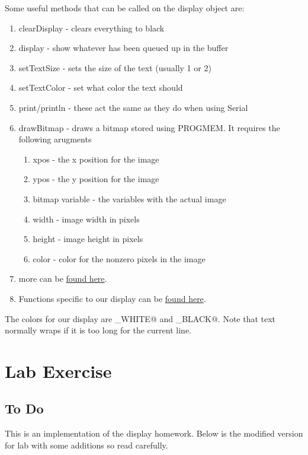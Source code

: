 Some useful methods that can be called on the display object are:
\begin{enumerate}
	\item clearDisplay - clears everything to black 
	\item display - show whatever has been queued up in the buffer
	\item setTextSize - sets the size of the text (usually 1 or 2)
	\item setTextColor - set what color the text should
	\item print/println - these act the same as they do when using Serial
	\item drawBitmap - draws a bitmap stored using PROGMEM. It requires the following arugments
	\begin{enumerate}
		\item xpos - the x position for the image
		\item ypos - the y position for the image
		\item bitmap variable - the variables with the actual image
		\item width - image width in pixels
		\item height - image height in pixels 
		\item color - color for the nonzero pixels in the image
	\end{enumerate}
	\item more can be \href{https://learn.adafruit.com/adafruit-gfx-graphics-library/graphics-primitives}{found here}.
	\item Functions specific to our display can be \href{https://github.com/adafruit/Adafruit_SSD1306/blob/master/Adafruit_SSD1306.h}{found here}.
\end{enumerate}
The colors for our display are _WHITE@ and _BLACK@. Note that text normally 
wraps if it is too long for the current line.

\section{Lab Exercise}
\subsection{To Do}
This is an implementation of the display homework. Below is the modified version for lab with some additions 
so read carefully.


